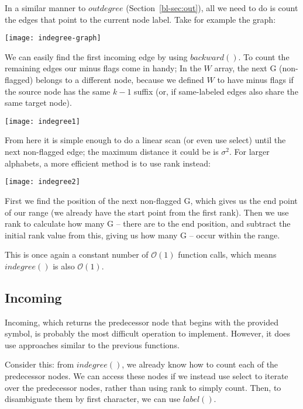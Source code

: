 In a similar manner to $\textit{outdegree}$ (Section~\ref{bl-sec:out}), all we need to do is count the edges that point to the current node label. Take for example the graph:

\medskip\centerline{\texttt{[image: indegree-graph]}}\medskip

We can easily find the first incoming edge by using $\textit{backward}()$. To count the remaining edges our minus flags come in handy; In the $W$ array, the next G (non-flagged) belongs to a different node, because we defined $W$ to have minus flags if the source node has the same $k-1$ suffix (or, if same-labeled edges also share the same target node).

\medskip\centerline{\texttt{[image: indegree1]}}\medskip

From here it is simple enough to do a linear scan (or even use select) until the next non-flagged edge; the maximum distance it could be is 
$\sigma^2$. For larger alphabets, a more efficient method is to use rank instead:

\medskip\centerline{\texttt{[image: indegree2]}}\medskip

First we find the position of the next non-flagged G, which gives us the end point of our range (we already have the start point from the first rank). Then we use rank to calculate how many G -- there are to the end position, and subtract the initial rank value from this, giving us how many G -- occur within the range.

This is once again a constant number of $\mathcal{O}(1)$ function calls, which means $\textit{indegree}()$ is also $\mathcal{O}(1)$.

\subsection{Incoming}\label{bl-sec:inc}

Incoming, which returns the predecessor node that begins with the provided symbol, is probably the most difficult operation to implement. However, it does use approaches similar to the previous functions.

Consider this: from $\textit{indegree}()$, we already know how to count each of the predecessor nodes. We can access these nodes if we instead use select to iterate over the predecessor nodes, rather than using rank to simply count. Then, to disambiguate them by first character, we can use $\textit{label}()$.

